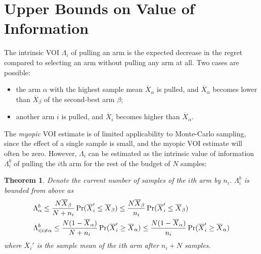 \documentclass{ecai2012}
\newtheorem{thm}{Theorem}
\begin{document}
\section{Upper Bounds on Value of Information}

The intrinsic VOI $\Lambda_i$ of pulling an arm is the expected decrease
in the regret compared to selecting an arm without pulling any arm at
all. Two cases are possible:
\begin{itemize}
\item the arm $\alpha$ with the highest sample mean $\overline
  X_\alpha$ is pulled, and $\overline X_\alpha$ becomes lower than
  $\overline X_\beta$ of the second-best arm $\beta$;
\item another arm $i$ is pulled, and $\overline X_i$ becomes higher
than $\overline X_\alpha$.
\end{itemize}
The \textit{myopic} VOI estimate is of limited applicability to
Monte-Carlo sampling, since the effect of a single sample is small,
and the myopic VOI estimate will often be zero. However, $\Lambda_i$
can be estimated as the intrinsic value of information $\Lambda_i^b$
of pulling the $i$th arm for the rest of the budget of $N$ samples:
\begin{thm} Denote the current number of samples of the $i$th arm by
  $n_i$. $\Lambda_i^b$ is bounded from above as
\begin{align}
  \Lambda&_\alpha^b \le \frac {N \overline X_\beta} {N+n_i}\Pr(\overline X_i'\le\overline X_\beta)
    \le \frac {N \overline X_\beta} {n_i} \Pr(\overline X_i'\le\overline X_\beta)\nonumber\\
\Lambda&_{i|i\ne\alpha}^b \le \frac{ N(1-\overline  X_\alpha)} {N+n_i}\Pr(\overline X_i'\ge\overline X_\alpha)
     \le \frac {N(1-\overline X_\alpha)} {n_i}\Pr(\overline   X_i'\ge\overline X_\alpha)
\vspace{-24pt}
\label{eqn:thm-be}
\end{align}
where $\overline X_i'$ is the sample mean of the $i$th arm after $n_i+N$ samples.
\label{thm:be}
\end{thm}
\end{document}
